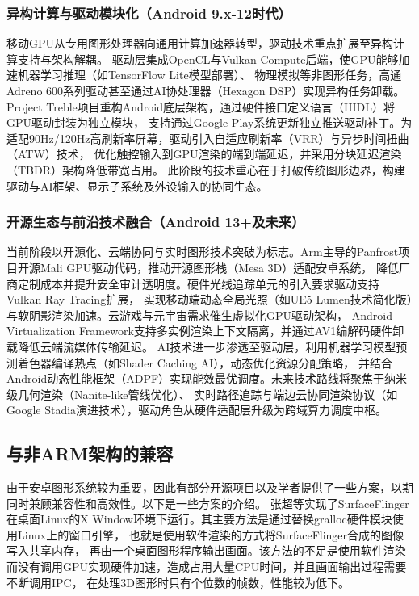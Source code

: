 \subsubsection{异构计算与驱动模块化（Android 9.x-12时代）​}

移动GPU从专用图形处理器向通用计算加速器转型，驱动技术重点扩展至异构计算支持与架构解耦。
驱动层集成OpenCL与Vulkan Compute后端，使GPU能够加速机器学习推理（如TensorFlow Lite模型部署\cite{tflite_gpu}）、
物理模拟等非图形任务，高通Adreno 600系列驱动甚至通过AI协处理器（Hexagon DSP）实现异构任务卸载。
Project Treble项目重构Android底层架构\cite{treble}，通过硬件接口定义语言（HIDL）将GPU驱动封装为独立模块\cite{hidl}，
支持通过Google Play系统更新独立推送驱动补丁。为适配90Hz/120Hz高刷新率屏幕，驱动引入自适应刷新率（VRR）\cite{AndroidARR}与异步时间扭曲（ATW）技术，
优化触控输入到GPU渲染的端到端延迟，并采用分块延迟渲染（TBDR）架构降低带宽占用。
此阶段的技术重心在于打破传统图形边界，构建驱动与AI框架、显示子系统及外设输入的协同生态。

\subsubsection{开源生态与前沿技术融合（Android 13+及未来）​​}

当前阶段以开源化、云端协同与实时图形技术突破为标志。Arm主导的Panfrost项目\cite{panfrost}开源Mali GPU驱动代码，推动开源图形栈（Mesa 3D）适配安卓系统\cite{mesa}，
降低厂商定制成本并提升安全审计透明度\cite{panfrost}。硬件光线追踪单元的引入要求驱动支持Vulkan Ray Tracing扩展\cite{vulkan_raytracing}，
实现移动端动态全局光照（如UE5 Lumen技术简化版）与软阴影渲染加速。云游戏与元宇宙需求催生虚拟化GPU驱动架构，
Android Virtualization Framework支持多实例渲染上下文隔离，并通过AV1编解码硬件卸载降低云端流媒体传输延迟\cite{avf}。
AI技术进一步渗透至驱动层，利用机器学习模型预测着色器编译热点（如Shader Caching AI），动态优化资源分配策略，
并结合Android动态性能框架（ADPF）实现能效最优调度。未来技术路线将聚焦于纳米级几何渲染（Nanite-like管线优化）、
实时路径追踪与端边云协同渲染协议（如Google Stadia演进技术），驱动角色从硬件适配层升级为跨域算力调度中枢。

\subsection{与非ARM架构的兼容}
由于安卓图形系统较为重要，因此有部分开源项目以及学者提供了一些方案，以期同时兼顾兼容性和高效性。以下是一些方案的介绍。
张超等实现了SurfaceFlinger在桌面Linux的X Window环境下运行。其主要方法是通过替换gralloc硬件模块使用Linux上的窗口引擎，
也就是使用软件渲染的方式将SurfaceFlinger合成的图像写入共享内存，
再由一个桌面图形程序输出画面。该方法的不足是使用软件渲染而没有调用GPU实现硬件加速，造成占用大量CPU时间，并且画面输出过程需要不断调用IPC，
在处理3D图形时只有个位数的帧数，性能较为低下\cite{张超2012Android}。

